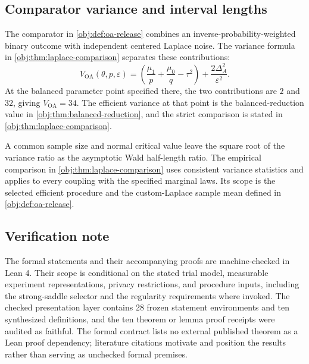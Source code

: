 \subsection{Comparator variance and interval lengths}

The comparator in \cref{obj:def:oa-release} combines an inverse-probability-weighted binary outcome with independent centered Laplace noise. The variance formula in \cref{obj:thm:laplace-comparison} separates these contributions:
\[
V_{\mathrm{OA}}(\theta,p,\varepsilon)
=
\left(\frac{\mu_1}{p}+\frac{\mu_0}{q}-\tau^2\right)
+
\frac{2\Delta_A^2}{\varepsilon^2}.
\]
At the balanced parameter point specified there, the two contributions are \(2\) and \(32\), giving \(V_{\mathrm{OA}}=34\). The efficient variance at that point is the balanced-reduction value in \cref{obj:thm:balanced-reduction}, and the strict comparison is stated in \cref{obj:thm:laplace-comparison}.

A common sample size and normal critical value leave the square root of the variance ratio as the asymptotic Wald half-length ratio. The empirical comparison in \cref{obj:thm:laplace-comparison} uses consistent variance statistics and applies to every coupling with the specified marginal laws. Its scope is the selected efficient procedure and the custom-Laplace sample mean defined in \cref{obj:def:oa-release}.

\subsection{Verification note}

The formal statements and their accompanying proofs are machine-checked in Lean 4. Their scope is conditional on the stated trial model, measurable experiment representations, privacy restrictions, and procedure inputs, including the strong-saddle selector and the regularity requirements where invoked. The checked presentation layer contains 28 frozen statement environments and ten synthesized definitions, and the ten theorem or lemma proof receipts were audited as faithful. The formal contract lists no external published theorem as a Lean proof dependency; literature citations motivate and position the results rather than serving as unchecked formal premises.
